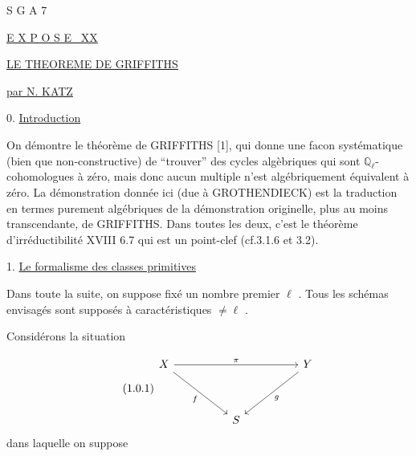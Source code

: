 


S G A 7


\underline{E X P O S E \ XX}


\underline{\underline{LE THEOREME DE GRIFFITHS}}


\underline{par N. KATZ}


0. \underline{Introduction}

On démontre le théorème de GRIFFITHS [1], qui donne une facon systématique (bien que non-constructive) de ``trouver'' des cycles algèbriques qui sont $\mathbb{Q}_\ell$-cohomologues à zéro, mais donc aucun multiple n'est algébriquement équivalent à zéro. La démonstration donnée ici (due à GROTHENDIECK) est la traduction en termes purement algébriques de la démonstration originelle, plus au moins transcendante, de GRIFFITHS. Dans toutes les deux, c'est le théorème d'irréductibilité XVIII 6.7 qui est un point-clef (cf.3.1.6 et 3.2).


1. \underline{Le formalisme des classes primitives}

Dans toute la suite, on suppose fixé un nombre premier $\ell$ . Tous les schémas envisagés sont supposés à caractéristiques $\neq \ell$ .

Considérons la situation

\begin{equation}\tag{1.0.1}
\begin{tikzcd}[column sep=huge, row sep=huge]
X \arrow[rr, "\pi"] \arrow[dr, "f"'] & {} & Y \arrow[dl, "g"] \\
{} & S &
{} \end{tikzcd}
\end{equation}
dans laquelle on suppose 


